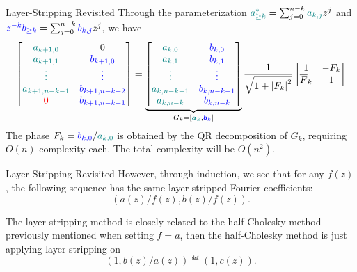 \begin{frame}{Layer-Stripping Revisited}
    Through the parameterization ${\color{teal}a_{\ge k}^*} = \sum_{j=0}^{n-k} {\color{teal}a_{k,j}} z^j$ and ${\color{blue}z^{-k}b_{\ge k}} = \sum_{j=0}^{n-k} {\color{blue}b_{k,j}} z^j$, we have
    \begin{equation}
        \left[\begin{matrix}
            \color{teal}a_{k+1,0} & \color{black}0 \\
            \color{teal}a_{k+1,1} & \color{blue}b_{k+1,0} \\
            \color{teal}\vdots & \color{blue}\vdots \\
            \color{teal}a_{k+1,n-k-1} & \color{blue}b_{k+1,n-k-2} \\
            {\color{red}0} & \color{blue}b_{k+1,n-k-1}
        \end{matrix}\right] = \underbrace{\left[\begin{matrix}
            \color{teal}a_{k,0} & \color{blue}b_{k,0} \\
            \color{teal}a_{k,1} & \color{blue}b_{k,1} \\
            \color{teal}\vdots & \color{blue}\vdots \\
            \color{teal}a_{k,n-k-1} & \color{blue}b_{k,n-k-1} \\
            \color{teal}a_{k,n-k} & \color{blue}b_{k,n-k}
        \end{matrix}\right]}_{G_{k} = [{\color{teal}\boldsymbol{a}_k},{\color{blue}\boldsymbol{b}_k}]} \frac{1}{\sqrt{1+\left|{F_k}\right|^2}} \left[\begin{matrix}
            1 & -F_k \\ \overline{F}_k & 1
        \end{matrix}\right]
    \end{equation}
    The phase $F_k = {\color{blue}b_{k,0}}/{\color{teal}a_{k,0}}$ is obtained by the QR decomposition of $G_k$, requiring $O(n)$ complexity each. The total complexity will be $O(n^2)$.
\end{frame}
\begin{frame}{Layer-Stripping Revisited}
    However, through induction, we see that for any $f(z)$, the following sequence has the same layer-stripped Fourier coefficients:
    \begin{equation*}
        \left(a(z)/f(z) , b(z)/f(z)\right).
    \end{equation*}

    The layer-stripping method is closely related to the half-Cholesky method previously mentioned when setting $f = a$, then the half-Cholesky method is just applying layer-stripping on
    \begin{equation*}
        \left(1,b(z)/a(z)\right) \eqdef \left(1,c(z)\right).
    \end{equation*}
\end{frame}

